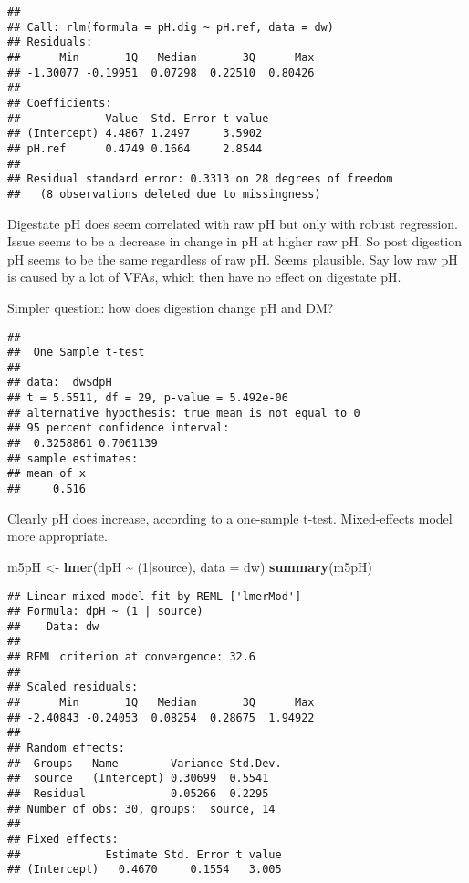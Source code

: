 \documentclass[
]{article}
\newenvironment{Shaded}{\begin{snugshade}}{\end{snugshade}}
\newcommand{\AttributeTok}[1]{\textcolor[rgb]{0.13,0.29,0.53}{#1}}
\newcommand{\DecValTok}[1]{\textcolor[rgb]{0.00,0.00,0.81}{#1}}
\newcommand{\FunctionTok}[1]{\textcolor[rgb]{0.13,0.29,0.53}{\textbf{#1}}}
\newcommand{\NormalTok}[1]{#1}
\newcommand{\OtherTok}[1]{\textcolor[rgb]{0.56,0.35,0.01}{#1}}
\newcommand{\SpecialCharTok}[1]{\textcolor[rgb]{0.81,0.36,0.00}{\textbf{#1}}}
\begin{document}
\begin{verbatim}
## 
## Call: rlm(formula = pH.dig ~ pH.ref, data = dw)
## Residuals:
##      Min       1Q   Median       3Q      Max 
## -1.30077 -0.19951  0.07298  0.22510  0.80426 
## 
## Coefficients:
##             Value  Std. Error t value
## (Intercept) 4.4867 1.2497     3.5902 
## pH.ref      0.4749 0.1664     2.8544 
## 
## Residual standard error: 0.3313 on 28 degrees of freedom
##   (8 observations deleted due to missingness)
\end{verbatim}

Digestate pH does seem correlated with raw pH but only with robust
regression. Issue seems to be a decrease in change in pH at higher raw
pH. So post digestion pH seems to be the same regardless of raw pH.
Seems plausible. Say low raw pH is caused by a lot of VFAs, which then
have no effect on digestate pH.

Simpler question: how does digestion change pH and DM?

\begin{Shaded}
\end{Shaded}

\begin{verbatim}
## 
##  One Sample t-test
## 
## data:  dw$dpH
## t = 5.5511, df = 29, p-value = 5.492e-06
## alternative hypothesis: true mean is not equal to 0
## 95 percent confidence interval:
##  0.3258861 0.7061139
## sample estimates:
## mean of x 
##     0.516
\end{verbatim}

Clearly pH does increase, according to a one-sample t-test.
Mixed-effects model more appropriate.

\begin{Shaded}
\begin{Highlighting}[]
\NormalTok{m5pH }\OtherTok{\textless{}{-}} \FunctionTok{lmer}\NormalTok{(dpH }\SpecialCharTok{\textasciitilde{}}\NormalTok{ (}\DecValTok{1}\SpecialCharTok{|}\NormalTok{source), }\AttributeTok{data =}\NormalTok{ dw)}
\FunctionTok{summary}\NormalTok{(m5pH)}
\end{Highlighting}
\end{Shaded}

\begin{verbatim}
## Linear mixed model fit by REML ['lmerMod']
## Formula: dpH ~ (1 | source)
##    Data: dw
## 
## REML criterion at convergence: 32.6
## 
## Scaled residuals: 
##      Min       1Q   Median       3Q      Max 
## -2.40843 -0.24053  0.08254  0.28675  1.94922 
## 
## Random effects:
##  Groups   Name        Variance Std.Dev.
##  source   (Intercept) 0.30699  0.5541  
##  Residual             0.05266  0.2295  
## Number of obs: 30, groups:  source, 14
## 
## Fixed effects:
##             Estimate Std. Error t value
## (Intercept)   0.4670     0.1554   3.005
\end{verbatim}
\end{document}

